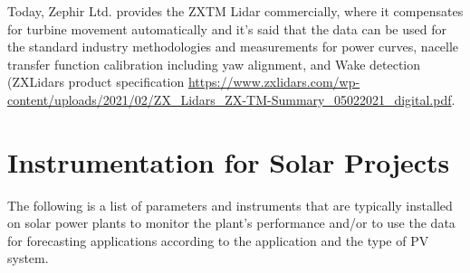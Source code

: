 Today, Zephir Ltd. provides the ZXTM Lidar commercially, where it compensates for turbine movement automatically and it's said that the data can be used for the standard industry methodologies and measurements for power curves, nacelle transfer function calibration including yaw alignment, and Wake detection (ZXLidars product specification \url{https://www.zxlidars.com/wp-content/uploads/2021/02/ZX_Lidars_ZX-TM-Summary_05022021_digital.pdf}.\\



\section{Instrumentation for Solar Projects}\label{sec:solar_instrumentation} 
{\color{blue}{Contributing authors: SW -- status ?}}


The following is a list of parameters and instruments that are typically installed on solar power plants to monitor the plant's performance and/or to use the data for forecasting applications according to the application and the type of PV system. 


